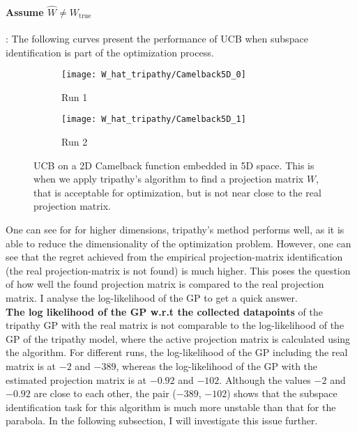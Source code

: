 \paragraph{Assume $\hat{W} \neq W_{\text{true}}$}: The following curves present the performance of UCB when subspace identification is part of the optimization process.

\begin{figure}[H]
    \centering
    \begin{subfigure}[b]{0.40\textwidth}
        \texttt{[image: W\_hat\_tripathy/Camelback5D\_0]}
        \label{fig:gull}
        \caption{Run 1}
    \end{subfigure}
    \begin{subfigure}[b]{0.40\textwidth}
        \texttt{[image: W\_hat\_tripathy/Camelback5D\_1]}
        \label{fig:tiger}
        \caption{Run 2}
    \end{subfigure}   
           \caption{UCB on a 2D Camelback function embedded in 5D space.
  This is when we apply tripathy's algorithm to find a projection matrix $W$, that is acceptable for optimization, but is not near close to the real projection matrix.}
\end{figure}

One can see for for higher dimensions, tripathy's method performs well, as it is able to reduce the dimensionality of the optimization problem.
However, one can see that the regret achieved from the empirical projection-matrix identification (the real projection-matrix is not found) is much higher.
This poses the question of how well the found projection matrix is compared to the real projection matrix.
I analyse the log-likelihood of the GP to get a quick answer. \\

\textbf{The log likelihood of the GP w.r.t the collected datapoints} of the tripathy GP with the real matrix is not comparable to the log-likelihood of the GP of the tripathy model, where the active projection matrix is calculated using the algorithm.
For different runs, the log-likelihood of the GP including the real matrix is at $-2$ and $-389$, whereas the log-likelihood of the GP with the estimated projection matrix is at $-0.92$ and $-102$. 
Although the values $-2$ and $-0.92$ are close to each other, the pair ($-389$, $-102$) shows that the subspace identification task for this algorithm is much more unstable than that for the parabola.
In the following subsection, I will investigate this issue further.

